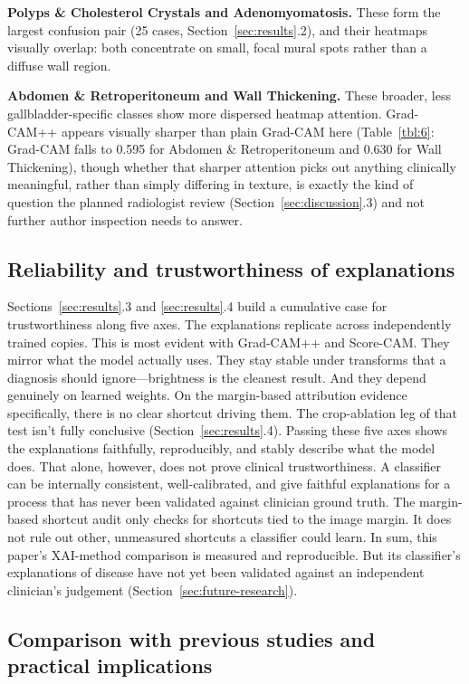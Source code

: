 \textbf{Polyps \& Cholesterol Crystals and Adenomyomatosis.} These form the largest confusion pair (25 cases, Section~\ref{sec:results}.2), and their heatmaps visually overlap: both concentrate on small, focal mural spots rather than a diffuse wall region.

\textbf{Abdomen \& Retroperitoneum and Wall Thickening.} These broader, less gallbladder-specific classes show more dispersed heatmap attention. Grad-CAM++ appears visually sharper than plain Grad-CAM here (Table~\ref{tbl:6}: Grad-CAM falls to 0.595 for Abdomen \& Retroperitoneum and 0.630 for Wall Thickening), though whether that sharper attention picks out anything clinically meaningful, rather than simply differing in texture, is exactly the kind of question the planned radiologist review (Section~\ref{sec:discussion}.3) and not further author inspection needs to answer.

\subsection{Reliability and trustworthiness of explanations}

Sections~\ref{sec:results}.3 and \ref{sec:results}.4 build a cumulative case for trustworthiness along five axes. The explanations replicate across independently trained copies. This is most evident with Grad-CAM++ and Score-CAM. They mirror what the model actually uses. They stay stable under transforms that a diagnosis should ignore---brightness is the cleanest result. And they depend genuinely on learned weights. On the margin-based attribution evidence specifically, there is no clear shortcut driving them. The crop-ablation leg of that test isn't fully conclusive (Section~\ref{sec:results}.4). Passing these five axes shows the explanations faithfully, reproducibly, and stably describe what the model does. That alone, however, does not prove clinical trustworthiness. A classifier can be internally consistent, well-calibrated, and give faithful explanations for a process that has never been validated against clinician ground truth. The margin-based shortcut audit only checks for shortcuts tied to the image margin. It does not rule out other, unmeasured shortcuts a classifier could learn. In sum, this paper's XAI-method comparison is measured and reproducible. But its classifier's explanations of disease have not yet been validated against an independent clinician's judgement (Section~\ref{sec:future-research}).

\subsection{Comparison with previous studies and practical implications}

